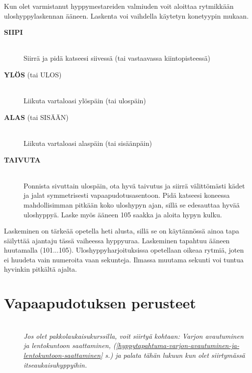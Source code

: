 Kun olet varmistanut hyppymestareiden valmiuden voit aloittaa rytmikkään uloshyppylaskennan ääneen. Laskenta voi vaihdella käytetyn konetyypin mukaan. 

\begin{description}
\item[\textbf{SIIPI}] \hfill \\ 
Siirrä ja pidä katseesi siivessä (tai vastaavassa kiintopisteessä) \hfill \\ 
\item[\textbf{YLÖS} (tai ULOS)] \hfill \\ 
Liikuta vartaloasi ylöspäin (tai ulospäin) \hfill \\ 
\item[\textbf{ALAS} (tai SISÄÄN)] \hfill \\ 
Liikuta vartaloasi alaspäin (tai sisäänpäin) \hfill \\ 
\item[\textbf{TAIVUTA}] \hfill \\ 
Ponnista sivuttain ulospäin, ota hyvä taivutus ja siirrä välittömästi kädet ja jalat symmetrisesti vapaapudotusasentoon. Pidä katseesi koneessa mahdollisimman pitkään koko uloshypyn ajan, sillä se edesauttaa hyvää uloshyppyä. Laske myös ääneen 105 saakka ja aloita hypyn kulku. \hfill \\ 
\end{description}

Laskeminen on tärkeää opetella heti alusta, sillä se on käytännössä ainoa tapa säilyttää ajantaju tässä vaiheessa hyppyuraa. Laskeminen tapahtuu ääneen huutamalla (101...105). Uloshyppyharjoituksissa opetellaan oikeaa rytmiä, joten ei huudeta vain numeroita vaan sekunteja. Ilmassa muutama sekunti voi tuntua hyvinkin pitkältä ajalta. 

\section{ Vapaapudotuksen perusteet }
\label{hyppytapahtuma-vapaapudotuksen-perusteet}

\begin{description}
\item[ ] \hfill \\ 
\textit{Jos olet pakkolaukaisukurssilla, voit siirtyä kohtaan: Varjon avautuminen ja lentokuntoon saattaminen, (\ref{hyppytapahtuma-varjon-avautuminen-ja-lentokuntoon-saattaminen} s.\pageref{hyppytapahtuma-varjon-avautuminen-ja-lentokuntoon-saattaminen}) ja palata tähän lukuun kun olet siirtymässä itseaukaisuhyppyihin.} \hfill \\ 
\end{description}

